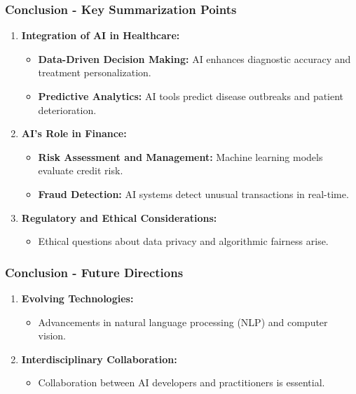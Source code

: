 \documentclass[aspectratio=169]{beamer}
\begin{document}
\begin{frame}[fragile]
    \frametitle{Conclusion - Key Summarization Points}
    \begin{enumerate}
        \item \textbf{Integration of AI in Healthcare:}
        \begin{itemize}
            \item \textbf{Data-Driven Decision Making:} AI enhances diagnostic accuracy and treatment personalization.
            \item \textbf{Predictive Analytics:} AI tools predict disease outbreaks and patient deterioration.
        \end{itemize}

        \item \textbf{AI’s Role in Finance:}
        \begin{itemize}
            \item \textbf{Risk Assessment and Management:} Machine learning models evaluate credit risk.
            \item \textbf{Fraud Detection:} AI systems detect unusual transactions in real-time.
        \end{itemize}

        \item \textbf{Regulatory and Ethical Considerations:}
        \begin{itemize}
            \item Ethical questions about data privacy and algorithmic fairness arise.
        \end{itemize}
    \end{enumerate}
\end{frame}

\begin{frame}[fragile]
    \frametitle{Conclusion - Future Directions}
    \begin{enumerate}
        \item \textbf{Evolving Technologies:}
        \begin{itemize}
            \item Advancements in natural language processing (NLP) and computer vision.
        \end{itemize}

        \item \textbf{Interdisciplinary Collaboration:}
        \begin{itemize}
            \item Collaboration between AI developers and practitioners is essential.
        \end{itemize}
    \end{enumerate}
\end{frame}
\end{document}
